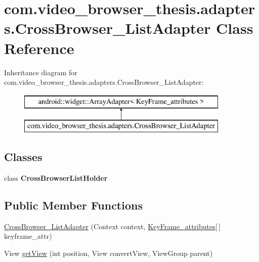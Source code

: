 \hypertarget{classcom_1_1video__browser__thesis_1_1adapters_1_1_cross_browser___list_adapter}{\section{com.\-video\-\_\-browser\-\_\-thesis.\-adapters.\-Cross\-Browser\-\_\-\-List\-Adapter Class Reference}
\label{classcom_1_1video__browser__thesis_1_1adapters_1_1_cross_browser___list_adapter}
}
Inheritance diagram for com.\-video\-\_\-browser\-\_\-thesis.\-adapters.\-Cross\-Browser\-\_\-\-List\-Adapter\-:\begin{figure}[H]
\begin{center}
\leavevmode
\includegraphics[height=2.000000cm]{classcom_1_1video__browser__thesis_1_1adapters_1_1_cross_browser___list_adapter}
\end{center}
\end{figure}
\subsection*{Classes}
\begin{DoxyCompactItemize}
\item 
class {\bfseries Cross\-Browser\-List\-Holder}
\end{DoxyCompactItemize}
\subsection*{Public Member Functions}
\begin{DoxyCompactItemize}
\item 
\hyperlink{classcom_1_1video__browser__thesis_1_1adapters_1_1_cross_browser___list_adapter_a77174d24bec2d33af4f0c3da439f545a}{Cross\-Browser\-\_\-\-List\-Adapter} (Context context, \hyperlink{classcom_1_1video__browser__thesis_1_1elements_1_1_key_frame__attributes}{Key\-Frame\-\_\-attributes}\mbox{[}$\,$\mbox{]} keyframe\-\_\-attr)
\item 
View \hyperlink{classcom_1_1video__browser__thesis_1_1adapters_1_1_cross_browser___list_adapter_a0cde829fd4ad4a587d096a0c4e649978}{get\-View} (int position, View convert\-View, View\-Group parent)
\end{DoxyCompactItemize}


